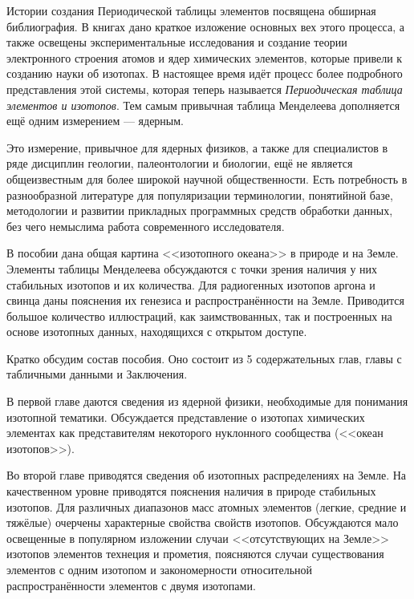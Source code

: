 \documentclass[a5paper,openany]{book}
\begin{document}
	Истории создания Периодической таблицы элементов посвящена обширная библиография. В книгах \cite{Lisnevsky1984, Trifonov1974, Scerri2019} дано краткое изложение основных вех этого процесса, а также освещены экспериментальные исследования и создание теории электронного строения атомов и ядер химических элементов, которые привели к созданию науки об изотопах.  В настоящее время идёт процесс более подробного представления этой системы, которая теперь называется \emph{Периодическая таблица элементов и изотопов}.
	 Тем самым привычная таблица Менделеева дополняется ещё одним измерением --- ядерным.  
	
	Это измерение, привычное для ядерных физиков, а также для специалистов в ряде дисциплин геологии, палеонтологии и биологии, ещё  не является общеизвестным для более широкой научной общественности. Есть потребность в разнообразной литературе для популяризации терминологии, понятийной базе, методологии и развитии прикладных программных средств обработки данных, без чего немыслима работа современного исследователя.
	
	В пособии дана общая картина <<изотопного океана>> в природе и на Земле. 
	Элементы таблицы Менделеева обсуждаются с точки зрения наличия у них стабильных изотопов и их количества.
	Для радиогенных изотопов аргона и свинца даны пояснения их генезиса и распространённости на Земле.
	Приводится большое количество иллюстраций, как заимствованных, так и построенных на основе изотопных данных, находящихся с открытом доступе.
	
	Кратко обсудим состав пособия. Оно состоит из 5 содержательных глав, главы с табличными данными и Заключения.
	
	В первой главе даются сведения из ядерной физики, необходимые для понимания изотопной тематики. Обсуждается представление о изотопах химических элементах как представителям некоторого нуклонного сообщества (<<океан изотопов>>).
	
	Во второй главе приводятся сведения об изотопных распределениях на Земле.
	На качественном уровне приводятся пояснения наличия в природе стабильных изотопов. Для различных диапазонов масс атомных элементов (легкие, средние и тяжёлые) очерчены характерные свойства свойств изотопов.
	Обсуждаются мало освещенные в популярном изложении случаи <<отсутствующих на Земле>> изотопов элементов технеция и прометия,
	поясняются случаи существования элементов с одним изотопом и закономерности относительной распространённости элементов с двумя изотопами.
	
\end{document}
